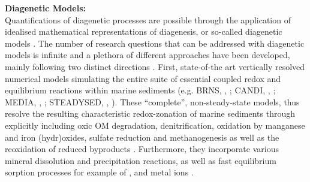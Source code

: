 \documentclass[gmd, manuscript]{copernicus}
\begin{document}

\textbf{Diagenetic Models:}\\
Quantifications of diagenetic processes are possible through the application of idealised 
mathematical representations of diagenesis, or so-called diagenetic models \citep[see e.g.][]{berner_early_1980, boudreau1997diagenetic}.
The number of research questions that can be addressed with diagenetic models is infinite and a plethora of different approaches have been developed, mainly 
following two distinct directions \citep{arndt_quantifying_2013}. 
First, state-of-the art vertically resolved numerical models simulating the entire suite of essential coupled redox and equilibrium reactions within marine sediments %
(e.g. BRNS, \citeauthor{aguilera_knowledge-based_2005}, \citeyear{aguilera_knowledge-based_2005}; 
CANDI, \citeauthor{boudreau_method--lines_1996}, \citeyear{boudreau_method--lines_1996}; MEDIA, \citeauthor{meysman_reactive_2003}, \citeyear{meysman_reactive_2003}; 
STEADYSED, \citeauthor{cappellen_cycling_1996}, \citeyear{cappellen_cycling_1996}). 
These ``complete'', non-steady-state models, thus resolve the resulting characteristic redox-zonation of marine sediments through explicitly including oxic OM degradation, 
denitrification, oxidation by manganese and iron (hydr)oxides, sulfate reduction and methanogenesis as well as the reoxidation of reduced byproducts 
\citep[i.e. , , , , , see e.g.][]{regnier_quantitative_2011, arndt_quantifying_2013}. 
Furthermore, they incorporate various mineral dissolution and precipitation reactions, as well as fast equilibrium sorption processes for example of 
,  and metal ions \citep[i.e. ,  and , compare][]{cappellen_cycling_1996, meysman_reactive_2003}. 
\end{document}
